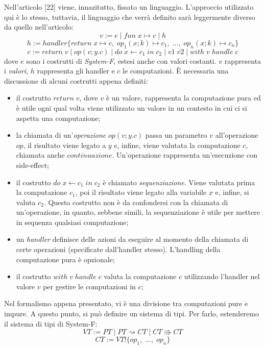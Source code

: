 \documentclass[10pt,a4paper]{article}
\begin{document}
Nell'articolo [22] viene, innazitutto, fissato un linguaggio. L'approccio utilizzato qui è lo stesso, tuttavia, il
linguaggio che verrà definito sarà leggermente diverso da quello nell'articolo:
\[ v := e \; | \; fun \; x \mapsto c \; | \; h \]
\[ h := handler \{ return \; x \mapsto c, \; op_1(x;k) \mapsto c_1, \; ..., \; op_n(x;k) \mapsto c_n \} \]
\[ c := return \; v \; | \; op(v;y.c) \; | \; do \; x \leftarrow c_1 \; in \; c_2 \; | \; v1 \; v2 \; | \; with \; v \; handle \; c \]
dove $ e $ sono i costrutti di \textit{System-F}, estesi anche con valori costanti. $ v $ rappresenta i \textit{valori},
$ h $ rappresenta gli handler e $ c $ le computazioni.
\`E necessaria una discussione di alcuni costrutti appena definiti:
\begin{itemize}
    \item il costrutto $ return \; v $, dove $ v $ è un valore, rappresenta la computazione pura ed è utile ogni qual
    volta viene utilizzato un valore in un contesto in cui ci si aspetta una computazione;
    \item la chiamata di un'\textit{operazione} $ op(v;y.c) $ passa un parametro $ v $ all'operazione $ op $, il
    risultato viene legato a $ y $ e, infine, viene valutata la computazione $ c $, chiamata anche $ continuazione $.
    Un'operazione rappresenta un'esecuzione con side-effect;
    \item il costrutto $ do \; x \leftarrow c_1 \; in \; c_2 $ è chiamato \textit{sequenziazione}. Viene valutata
    prima la computazione $ c_1 $, poi il risultato viene legato alla variabile $ x $ e, infine, si valuta $ c_2 $.
    Questo costrutto non è da confondersi con la chiamata di un'operazione, in quanto, sebbene simili, la sequenziazione
    è utile per mettere in sequenza qualsiasi computazione;
    \item un \textit{handler} definisce delle azioni da eseguire al momento della chiamata di certe operazioni
    (specificate dall'handler stesso). L'handling della computazione pura è opzionale;
    \item il costrutto $ with \; v \; handle \; c $ valuta la computazione $ c $ utilizzando l'handler nel valore
    $ v $ per gestire le computazioni in $ c $;
\end{itemize}
Nel formalismo appena presentato, vi è una divisione tra computazioni pure e impure. A questo punto, si può definire
un sistema di tipi. Per farlo, estenderemo il sistema di tipi di System-F:
\[ VT := PT \; | \; PT \rightsquigarrow CT \; | \; CT \Rrightarrow CT \]
\[ CT := VT ! \{ op_1, \; ..., \; op_n \} \]
\end{document}
